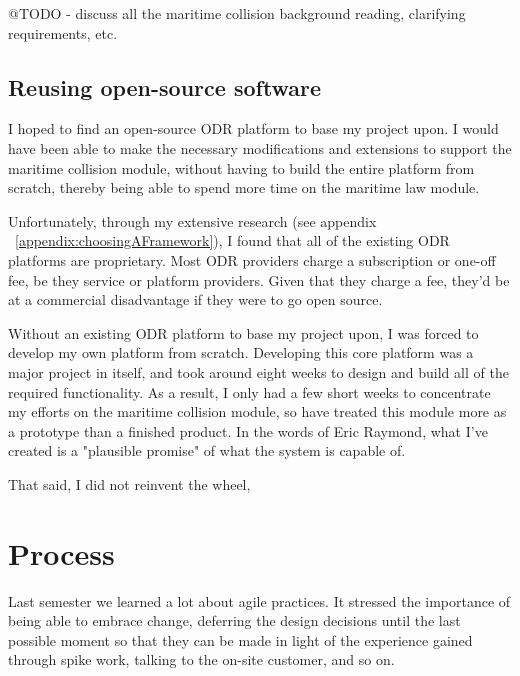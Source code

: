 @TODO - discuss all the maritime collision background reading, clarifying requirements, etc.

\subsection{Reusing open-source software}

I hoped to find an open-source ODR platform to base my project upon. I would have been able to make the necessary modifications and extensions to support the maritime collision module, without having to build the entire platform from scratch, thereby being able to spend more time on the maritime law module.

Unfortunately, through my extensive research (see appendix ~\ref{appendix:choosingAFramework}), I found that all of the existing ODR platforms are proprietary. Most ODR providers charge a subscription or one-off fee, be they service or platform providers. Given that they charge a fee, they'd be at a commercial disadvantage if they were to go open source.

Without an existing ODR platform to base my project upon, I was forced to develop my own platform from scratch. Developing this core platform was a major project in itself, and took around eight weeks to design and build all of the required functionality. As a result, I only had a few short weeks to concentrate my efforts on the maritime collision module, so have treated this module more as a prototype than a finished product. In the words of Eric Raymond, what I've created is a "plausible promise" of what the system is capable of.

That said, I did not reinvent the wheel,

\section{Process} %

Last semester we learned a lot about agile practices. It stressed the importance of being able to embrace change, deferring the design decisions until the last possible moment so that they can be made in light of the experience gained through spike work, talking to the on-site customer, and so on.

